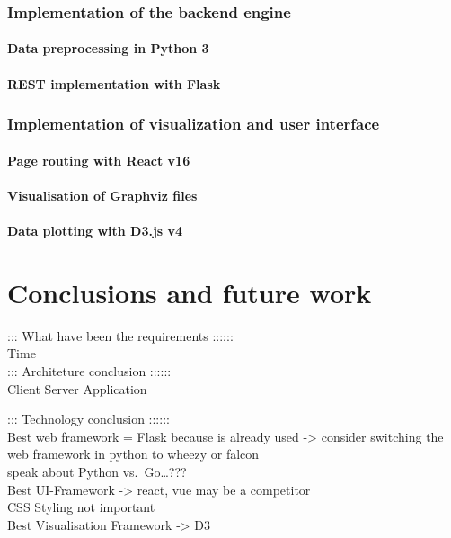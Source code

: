 \documentclass[american,a4paper,oneside,,tablecaptionabove]{scrbook}
\begin{document}
\subsection{Implementation of the backend
engine}\label{implementation-of-the-backend-engine}

\subsubsection{Data preprocessing in Python
3}\label{data-preprocessing-in-python-3}

\subsubsection{REST implementation with
Flask}\label{rest-implementation-with-flask}

\subsection{Implementation of visualization and user
interface}\label{implementation-of-visualization-and-user-interface}

\subsubsection{Page routing with React
v16}\label{page-routing-with-react-v16}

\subsubsection{Visualisation of Graphviz
files}\label{visualisation-of-graphviz-files}

\subsubsection{Data plotting with D3.js
v4}\label{data-plotting-with-d3.js-v4}

\chapter{Conclusions and future work}\label{conclusions-and-future-work}

::: What have been the requirements ::::::\\
Time\\
::: Architeture conclusion ::::::\\
Client Server Application

::: Technology conclusion ::::::\\
Best web framework = Flask because is already used -\textgreater{}
consider switching the web framework in python to wheezy or falcon\\
speak about Python vs.~Go\ldots{}???\\
Best UI-Framework -\textgreater{} react, vue may be a competitor\\
CSS Styling not important\\
Best Visualisation Framework -\textgreater{} D3
\end{document}
